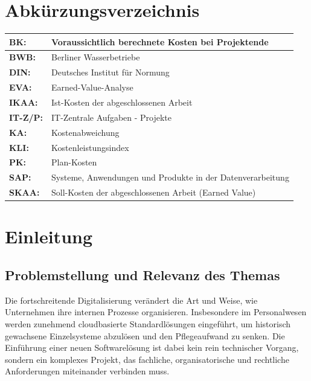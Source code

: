 \documentclass[
    12pt, 
    a4paper,
    ]{scrartcl} %
\begin{document}
\section*{Abkürzungsverzeichnis}  
\vspace{0.6cm}
\begin{tabular}{p{4cm} p{11.35cm}}   
    \textbf{\normalsize BK:} & \normalsize Voraussichtlich berechnete Kosten bei Projektende \\[0.5cm]
    \hline
    \textbf{\normalsize BWB:} & \normalsize Berliner Wasserbetriebe \\[0.5cm]
    \hline
    \textbf{\normalsize DIN:} & \normalsize Deutsches Institut für Normung \\[0.5cm]
    \hline
    \textbf{\normalsize EVA:} & \normalsize Earned-Value-Analyse \\[0.5cm]
    \hline
    \textbf{\normalsize IKAA:} & \normalsize Ist-Kosten der abgeschlossenen Arbeit \\[0.5cm]
    \hline
    \textbf{\normalsize IT-Z/P:} & \normalsize IT-Zentrale Aufgaben - Projekte \\[0.5cm]
    \hline
    \textbf{\normalsize KA:} & \normalsize Kostenabweichung \\[0.5cm]
    \hline
    \textbf{\normalsize KLI:} & \normalsize Kostenleistungsindex \\[0.5cm]
    \hline
    \textbf{\normalsize PK:} & \normalsize Plan-Kosten \\[0.5cm]
    \hline
    \textbf{\normalsize SAP:} & \normalsize Systeme, Anwendungen und Produkte in der Datenverarbeitung \\[0.5cm]
    \hline
    \textbf{\normalsize SKAA:} & \normalsize Soll-Kosten der abgeschlossenen Arbeit (Earned Value) \\[0.5cm]
 \end{tabular}

\newpage
{} %
\setcounter{page}{1}


\section{Einleitung}

\subsection{Problemstellung und Relevanz des Themas}
Die fortschreitende Digitalisierung verändert die Art und Weise, wie Unternehmen ihre internen Prozesse organisieren. Insbesondere im Personalwesen werden zunehmend cloudbasierte Standardlösungen eingeführt, um historisch gewachsene Einzelsysteme abzulösen und den Pflegeaufwand zu senken. Die Einführung einer neuen Softwarelösung ist dabei kein rein technischer Vorgang, sondern ein komplexes Projekt, das fachliche, organisatorische und rechtliche Anforderungen miteinander verbinden muss.
\end{document}
